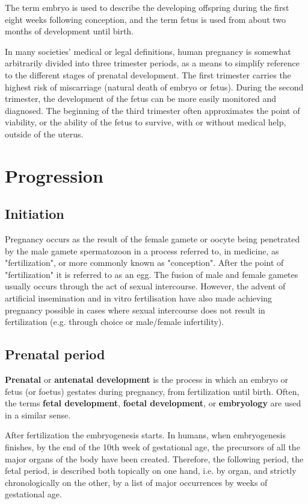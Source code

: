 \documentclass[12pt,a4paper,onecolumn]{article}
\begin{document}
The term embryo is used to describe the developing offspring during the first eight weeks following
conception, and the term fetus is used from about two months of development until birth.

In many societies' medical or legal definitions, human pregnancy is somewhat arbitrarily divided
into three trimester periods, as a means to simplify reference to the different stages of prenatal
development. The first trimester carries the highest risk of miscarriage (natural death of embryo or
fetus). During the second trimester, the development of the fetus can be more easily monitored and
diagnosed. The beginning of the third trimester often approximates the point of viability, or the
ability of the fetus to survive, with or without medical help, outside of the uterus.

\section{Progression}

\subsection{Initiation}

Pregnancy occurs as the result of the female gamete or oocyte being penetrated by the male gamete
spermatozoon in a process referred to, in medicine, as "fertilization", or more commonly known as
"conception". After the point of "fertilization" it is referred to as an egg. The fusion of male and
female gametes usually occurs through the act of sexual intercourse. However, the advent of
artificial insemination and in vitro fertilisation have also made achieving pregnancy possible in
cases where sexual intercourse does not result in fertilization (e.g. through choice or male/female
infertility).

\subsection{Prenatal period}

\textbf{Prenatal} or \textbf{antenatal development} is the process in which an embryo or fetus (or
foetus) gestates during pregnancy, from fertilization until birth. Often, the terms \textbf{fetal
  development}, \textbf{foetal development}, or \textbf{embryology} are used in a similar sense.

After fertilization the embryogenesis starts. In humans, when embryogenesis finishes, by the end of
the 10th week of gestational age, the precursors of all the major organs of the body have been
created. Therefore, the following period, the fetal period, is described both topically on one hand,
i.e. by organ, and strictly chronologically on the other, by a list of major occurrences by weeks of
gestational age.
\end{document}
